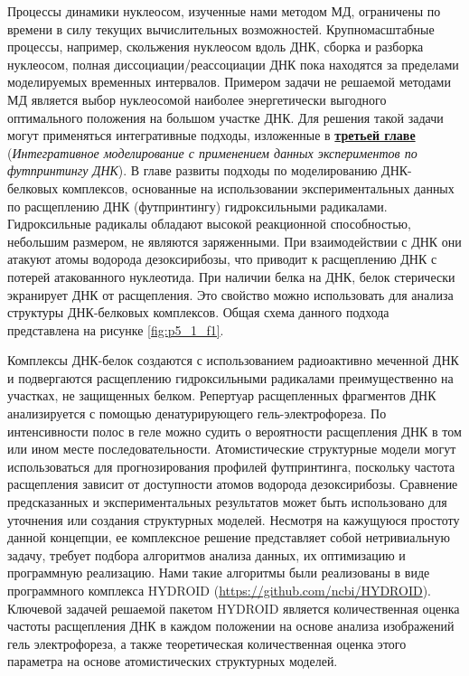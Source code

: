 Процессы динамики нуклеосом, изученные нами методом МД, ограничены по времени в силу текущих вычислительных возможностей. Крупномасштабные процессы, например, скольжения нуклеосом вдоль ДНК, сборка и разборка нуклеосом, полная диссоциации/реассоциации ДНК пока находятся за пределами моделируемых временных интервалов. Примером задачи не решаемой методами МД является выбор нуклеосомой наиболее энергетически выгодного оптимального положения на большом участке ДНК. Для решения такой задачи могут применяться интегративные подходы, изложенные в \underline{\textbf{третьей главе}} (\textit{Интегративное моделирование с применением данных экспериментов по футпринтингу ДНК}). В главе развиты подходы по моделированию ДНК-белковых комплексов, основанные на использовании экспериментальных данных по расщеплению ДНК (футпринтингу) гидроксильными радикалами. Гидроксильные радикалы обладают высокой реакционной способностью, небольшим размером, не являются заряженными. При взаимодействии с ДНК они атакуют атомы водорода дезоксирибозы, что приводит к расщеплению ДНК с потерей атакованного нуклеотида. При наличии белка на ДНК, белок стерически экранирует ДНК от расщепления. Это свойство можно использовать для анализа структуры ДНК-белковых комплексов. Общая схема данного подхода представлена на рисунке \ref{fig:p5_1_f1}.

 Комплексы ДНК-белок создаются с использованием радиоактивно меченной ДНК и подвергаются расщеплению гидроксильными радикалами преимущественно на участках, не защищенных белком. Репертуар расщепленных фрагментов ДНК анализируется с помощью денатурирующего гель-электрофореза. По интенсивности полос в геле можно судить о вероятности расщепления ДНК в том или ином месте последовательности. Атомистические структурные модели могут использоваться для прогнозирования профилей футпринтинга, поскольку частота расщепления зависит от доступности атомов водорода дезоксирибозы. Сравнение предсказанных и экспериментальных результатов может быть использовано для уточнения или создания структурных моделей. Несмотря на кажущуюся простоту данной концепции, ее комплексное решение представляет собой нетривиальную задачу, требует подбора алгоритмов анализа данных, их оптимизацию и программную реализацию. Нами такие алгоритмы были реализованы в виде программного комплекса HYDROID \cite{shaytan_structural_2018} (\url{https://github.com/ncbi/HYDROID}). Ключевой задачей решаемой пакетом HYDROID является количественная оценка частоты расщепления ДНК в каждом положении на основе анализа изображений гель электрофореза, а также теоретическая количественная оценка этого параметра на основе атомистических структурных моделей.

